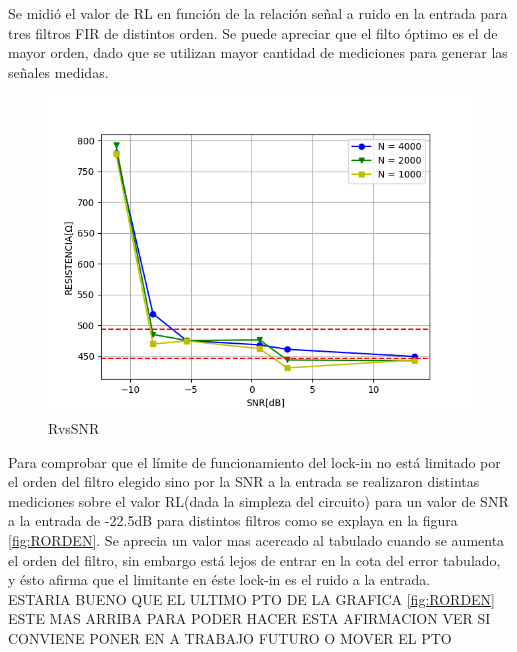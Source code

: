 \documentclass[11pt,a4paper]{extarticle}
\begin{document}
\begin{multicols}{2}
Se midió el valor de RL en función 
de la relación señal a ruido en la entrada para tres 
filtros FIR de distintos orden.
Se puede apreciar que el filto óptimo es el de mayor 
orden, dado que se utilizan mayor cantidad de 
mediciones para generar las señales medidas.

\begin{figure}[H]
	\centering
	\includegraphics[width=\linewidth]{Images/RvsSNR(segunda).png}
	\caption{RvsSNR}
	\label{fig:RvsSNR}
\end{figure}

Para comprobar que el límite de funcionamiento 
del lock-in no está limitado por el orden del 
filtro elegido sino por la SNR a la entrada
se realizaron distintas mediciones 
sobre el valor RL(dada la simpleza del circuito) 
para un valor de SNR a la entrada de -22.5dB para 
distintos filtros como se explaya en la figura 
\ref{fig:RORDEN}. Se aprecia un valor mas acercado 
al tabulado cuando se aumenta el orden del filtro, sin 
embargo está lejos de entrar en la cota del error 
tabulado, y ésto afirma que el limitante en éste 
lock-in es el ruido a la entrada.\\

ESTARIA BUENO QUE EL ULTIMO PTO DE LA GRAFICA \ref{fig:RORDEN}
ESTE MAS ARRIBA PARA PODER HACER ESTA AFIRMACION 
VER SI CONVIENE PONER EN A TRABAJO FUTURO O MOVER EL PTO\\


\end{multicols}
\end{document}
